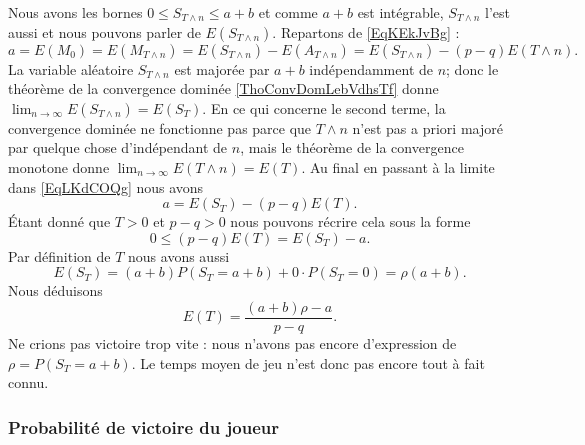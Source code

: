 Nous avons les bornes \( 0\leq S_{T\wedge n}\leq a+b\) et comme \( a+b\) est intégrable, \( S_{T\wedge n}\) l'est aussi et nous pouvons parler de \( E(S_{T\wedge n})\). Repartons de \eqref{EqKEkJvBg} :
\begin{equation}    \label{EqLKdCOQg}
    a=E(M_0)=E(M_{T\wedge n})=E(S_{T\wedge n})-E(A_{T\wedge n})=E(S_{T\wedge n})-(p-q)E(T\wedge n).
\end{equation}
La variable aléatoire \( S_{T\wedge n}\) est majorée par \( a+b\) indépendamment de \( n\); donc le théorème de la convergence dominée \ref{ThoConvDomLebVdhsTf} donne \( \lim_{n\to \infty} E(S_{T\wedge n})=E(S_T)\). En ce qui concerne le second terme, la convergence dominée ne fonctionne pas parce que \( T\wedge n\) n'est pas a priori majoré par quelque chose d'indépendant de \( n\), mais le théorème de la convergence monotone donne \( \lim_{n\to \infty} E(T\wedge n)=E(T)\). Au final en passant à la limite dans \eqref{EqLKdCOQg} nous avons
\begin{equation}
    a=E(S_T)-(p-q)E(T).
\end{equation}
Étant donné que \( T>0\) et \( p-q>0\) nous pouvons récrire cela sous la forme
\begin{equation}
    0\leq (p-q)E(T)=E(S_T)-a.
\end{equation}
Par définition de \( T\) nous avons aussi
\begin{equation}
    E(S_T)=(a+b)P(S_T=a+b)+0\cdot P(S_T=0)=\rho(a+b).
\end{equation}
Nous déduisons
\begin{equation}
    E(T)=\frac{ (a+b)\rho-a }{ p-q }.
\end{equation}
Ne crions pas victoire trop vite : nous n'avons pas encore d'expression de \( \rho=P(S_T=a+b)\). Le temps moyen de jeu n'est donc pas encore tout à fait connu.

\subsubsection{Probabilité de victoire du joueur}


